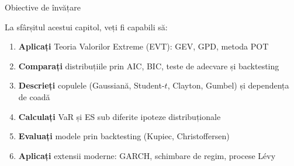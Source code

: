 \documentclass[9pt, aspectratio=169, t]{beamer}
\theoremstyle{definition}
\begin{document}
\begin{frame}{Obiective de învățare}
    \begin{block}{La sfârșitul acestui capitol, veți fi capabili să:}
    \begin{enumerate}
        \item[\textcolor{MainBlue}{\textbf{1.}}] \textbf{Aplicați} Teoria Valorilor Extreme (EVT): GEV, GPD, metoda POT
        \item[\textcolor{MainBlue}{\textbf{2.}}] \textbf{Comparați} distribuțiile prin AIC, BIC, teste de adecvare și backtesting
        \item[\textcolor{MainBlue}{\textbf{3.}}] \textbf{Descrieți} copulele (Gaussiană, Student-$t$, Clayton, Gumbel) și dependența de coadă
        \item[\textcolor{MainBlue}{\textbf{4.}}] \textbf{Calculați} VaR și ES sub diferite ipoteze distribuționale
        \item[\textcolor{MainBlue}{\textbf{5.}}] \textbf{Evaluați} modele prin backtesting (Kupiec, Christoffersen)
        \item[\textcolor{MainBlue}{\textbf{6.}}] \textbf{Aplicați} extensii moderne: GARCH, schimbare de regim, procese L\'{e}vy
    \end{enumerate}
    \end{block}
\end{frame}
\end{document}
